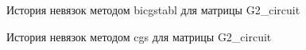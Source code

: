 \begin{figure}[H]
    \renewcommand{\figurename}{Рисунок}
    \caption{История невязок методом bicgstabl для матрицы G2\_circuit}
    \label{fig:image_46}
\end{figure}

\begin{figure}[H]
    \renewcommand{\figurename}{Рисунок}
    \caption{История невязок методом cgs для матрицы G2\_circuit}
    \label{fig:image_47}
\end{figure}


